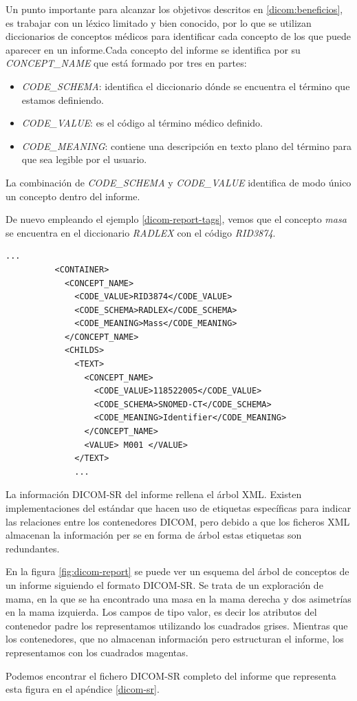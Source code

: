 Un punto importante para alcanzar los objetivos descritos en \ref{dicom:beneficios}, es trabajar con un léxico limitado y bien conocido, por lo que se utilizan diccionarios de conceptos médicos para identificar cada concepto de los que puede aparecer en un informe.Cada concepto del informe se identifica por su \textit{CONCEPT\_NAME} que está formado por tres en partes:
\begin{itemize}
	\item \textit{CODE\_SCHEMA}: identifica el diccionario dónde se encuentra el término que estamos definiendo.
	\item \textit{CODE\_VALUE}: es el código al término médico definido.
	\item \textit{CODE\_MEANING}: contiene una descripción en texto plano del término para que sea legible por el usuario.
\end{itemize}
La combinación de \textit{CODE\_SCHEMA} y \textit{CODE\_VALUE} identifica de modo único un concepto dentro del informe.\par
De nuevo empleando el ejemplo \ref{dicom-report-tags}, vemos que el concepto \textit{masa} se encuentra en el diccionario \textit{RADLEX} con el código \textit{RID3874}.\medskip\par

\lstset{escapechar=@,style=dicom}
\renewcommand*\lstlistingname{Código}
\begin{lstlisting}[label=dicom-report-tags,caption=Fragmento de un informe estructurado de una exploración de mama]
		  ...
          <CONTAINER>
            <CONCEPT_NAME>
              <CODE_VALUE>RID3874</CODE_VALUE>
              <CODE_SCHEMA>RADLEX</CODE_SCHEMA>
              <CODE_MEANING>Mass</CODE_MEANING>
            </CONCEPT_NAME>
            <CHILDS>
              <TEXT>
                <CONCEPT_NAME>
                  <CODE_VALUE>118522005</CODE_VALUE>
                  <CODE_SCHEMA>SNOMED-CT</CODE_SCHEMA>
                  <CODE_MEANING>Identifier</CODE_MEANING>
                </CONCEPT_NAME>
                <VALUE> M001 </VALUE>
              </TEXT>
              ...
\end{lstlisting}

La información DICOM-SR del informe rellena el árbol XML. Existen implementaciones del estándar que hacen uso de etiquetas específicas para indicar las relaciones entre los contenedores DICOM, pero debido a que los ficheros XML almacenan la información per se en forma de árbol estas etiquetas son redundantes.\par
En la figura \ref{fig:dicom-report} se puede ver un esquema del árbol de conceptos de un informe siguiendo el formato DICOM-SR. Se trata de un exploración de mama, en la que se ha encontrado una masa en la mama derecha y dos asimetrías en la mama izquierda. Los campos de tipo valor, es decir los atributos del contenedor padre los representamos utilizando los cuadrados grises. Mientras que los contenedores, que no almacenan información pero estructuran el informe, los representamos con los cuadrados magentas.\par
Podemos encontrar el fichero DICOM-SR completo del informe que representa esta figura en el apéndice \ref{dicom-sr}.	\par

